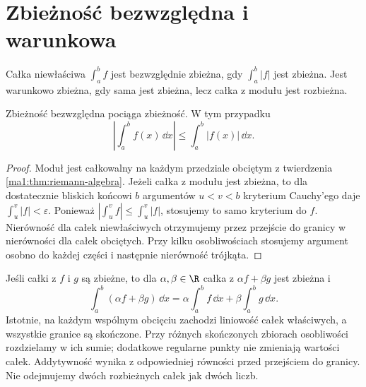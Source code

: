 \section{Zbieżność bezwzględna i warunkowa}
\begin{definicja}
\label{ma1:def:improper-absolute}
Całka niewłaściwa $\int_a^b f$ jest bezwzględnie zbieżna, gdy $\int_a^b |f|$ jest zbieżna. Jest warunkowo zbieżna, gdy sama jest zbieżna, lecz całka z modułu jest rozbieżna.
\end{definicja}
\begin{twierdzenie}
\label{ma1:thm:improper-absolute-convergence}
Zbieżność bezwzględna pociąga zbieżność. W tym przypadku
\[
 \left|\int_a^b f(x)\,\dd x\right|\le\int_a^b |f(x)|\,\dd x.
\]
\end{twierdzenie}
\begin{proof}
Moduł jest całkowalny na każdym przedziale obciętym z twierdzenia \ref{ma1:thm:riemann-algebra}. Jeżeli całka z modułu jest zbieżna, to dla dostatecznie bliskich końcowi $b$ argumentów $u<v<b$ kryterium Cauchy'ego daje $\int_u^v |f|<\varepsilon$. Ponieważ $|\int_u^v f|\le\int_u^v |f|$, stosujemy to samo kryterium do $f$. Nierówność dla całek niewłaściwych otrzymujemy przez przejście do granicy w nierówności dla całek obciętych. Przy kilku osobliwościach stosujemy argument osobno do każdej części i następnie nierówność trójkąta.
\end{proof}
Jeśli całki z $f$ i $g$ są zbieżne, to dla $\alpha,\beta\in\R$ całka z $\alpha f+\beta g$ jest zbieżna i
\[
 \int_a^b(\alpha f+\beta g)\,\dd x
 =\alpha\int_a^b f\,\dd x+\beta\int_a^b g\,\dd x.
\]
Istotnie, na każdym wspólnym obcięciu zachodzi liniowość całek właściwych, a wszystkie granice są skończone. Przy różnych skończonych zbiorach osobliwości rozdzielamy w ich sumie; dodatkowe regularne punkty nie zmieniają wartości całek. Addytywność wynika z odpowiedniej równości przed przejściem do granicy. Nie odejmujemy dwóch rozbieżnych całek jak dwóch liczb.

